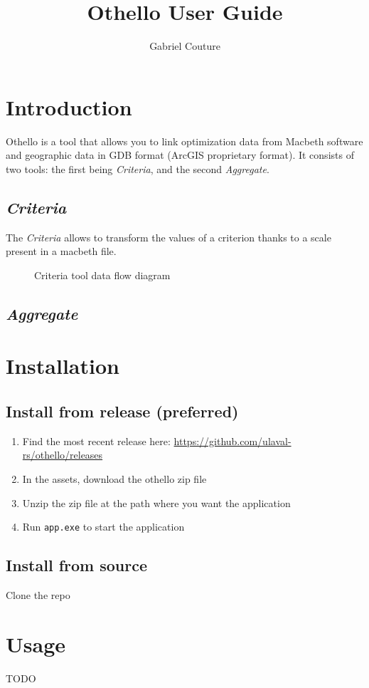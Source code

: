 \documentclass[11pt]{article}
\title{Othello User Guide}
\author{Gabriel Couture}
\begin{document}
    \maketitle
    \tableofcontents
    \newpage


    \section{Introduction}\label{sec:introduction}
    Othello is a tool that allows you to link optimization data from Macbeth software
    and geographic data in GDB format (ArcGIS proprietary format).
    It consists of two tools: the first being \textit{Criteria}, and the second \textit{Aggregate}.

    \subsection{\textit{Criteria}}\label{subsec:criteria}
    The \textit{Criteria} allows to transform the values of a criterion thanks
    to a scale present in a macbeth file. 

    \begin{figure}[h]
        \centering
        
        \caption{Criteria tool data flow diagram}
        \label{fig:criteria-tool}
    \end{figure}

    \subsection{\textit{Aggregate}}\label{subsec:aggregate}


    \section{Installation}\label{sec:installation}

    \subsection{Install from release (preferred)}\label{subsec:install-from-release-(preferred)}
    \begin{enumerate}
        \item Find the most recent release here: \url{https://github.com/ulaval-rs/othello/releases}
        \item In the assets, download the othello zip file
        \item Unzip the zip file at the path where you want the application
        \item Run \texttt{app.exe} to start the application
    \end{enumerate}

    \subsection{Install from source}\label{subsec:install-from-source}
    Clone the repo


    \section{Usage}\label{sec:usage}
    TODO
\end{document}
